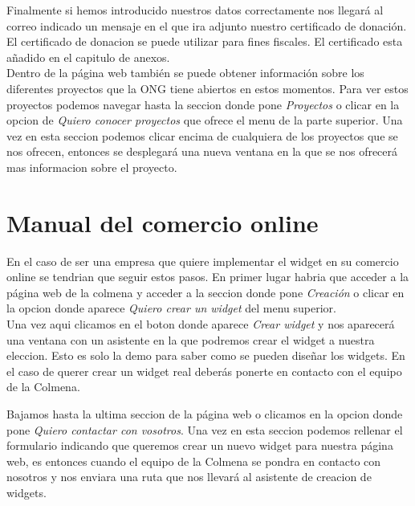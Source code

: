 
Finalmente si hemos introducido nuestros datos correctamente nos llegará al correo indicado un mensaje en el que ira adjunto nuestro certificado de donación. El certificado de donacion se puede utilizar para fines fiscales. El certificado esta añadido en el capitulo de anexos.\\

Dentro de la página web también se puede obtener información sobre los diferentes proyectos que la ONG tiene abiertos en estos momentos. Para ver estos proyectos podemos navegar hasta la seccion donde pone \textit{Proyectos} o clicar en la opcion de \textit{Quiero conocer proyectos} que ofrece el menu de la parte superior. Una vez en esta seccion podemos clicar encima de cualquiera de los proyectos que se nos ofrecen, entonces se desplegará una nueva ventana en la que se nos ofrecerá mas informacion sobre el proyecto.


\section{Manual del comercio online}
En el caso de ser una empresa que quiere implementar el widget en su comercio online se tendrian que seguir estos pasos. En primer lugar habria que acceder a la página web de la colmena y acceder a la seccion donde pone \textit{Creación} o clicar en la opcion donde aparece \textit{Quiero crear un widget} del menu superior.\\

Una vez aqui clicamos en el boton donde aparece \textit{Crear widget} y nos aparecerá una ventana con un asistente en la que podremos crear el widget a nuestra eleccion. Esto es solo la demo para saber como se pueden diseñar los widgets. En el caso de querer crear un widget real deberás ponerte en contacto con el equipo de la Colmena.\\


Bajamos hasta la ultima seccion de la página web o clicamos en la opcion donde pone \textit{Quiero contactar con vosotros}. Una vez en esta seccion podemos rellenar el formulario indicando que queremos crear un nuevo widget para nuestra página web, es entonces cuando el equipo de la Colmena se pondra en contacto con nosotros y nos enviara una ruta que nos llevará al asistente de creacion de widgets.\\

